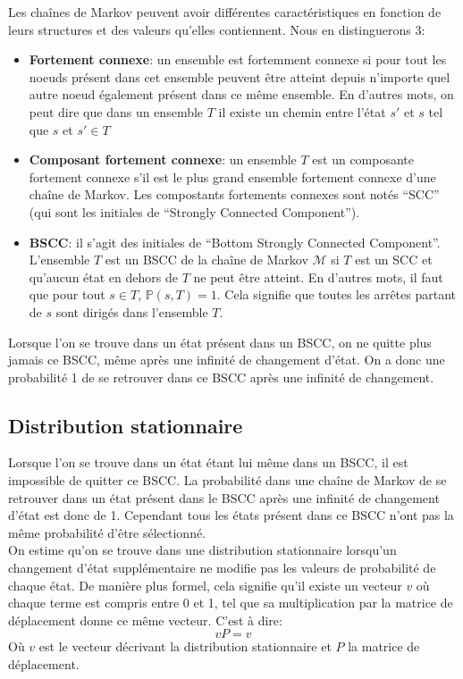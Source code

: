 \documentclass[letterpaper]{article}
\begin{document}
    Les chaînes de Markov peuvent avoir différentes caractéristiques en fonction 
    de leurs structures et des valeurs qu'elles contiennent.  
    Nous en distinguerons 3:
    \begin{itemize}
     \item \textbf{Fortement connexe}: un ensemble est fortemment connexe si pour tout
      les noeuds présent dans cet ensemble peuvent être atteint depuis n'importe quel
      autre noeud également présent dans ce même ensemble.  En d'autres mots, on peut dire 
      que dans un ensemble $T$ il existe un chemin entre l'état $s'$ et $s$ tel que 
      $s$ et $s' \in T$
     \item \textbf{Composant fortement connexe}: un ensemble $T$ est un composante fortement
      connexe s'il est le plus grand ensemble fortement connexe d'une chaîne de Markov.  
      Les compostants fortements connexes sont notés ``SCC'' (qui sont les initiales de
      ``Strongly Connected Component'').
     \item \textbf{BSCC}: il s'agit des initiales de ``Bottom Strongly Connected Component''.
      L'ensemble $T$ est un BSCC de la chaîne de Markov $\mathcal{M}$ si $T$ est un SCC et
      qu'aucun état en dehors de $T$ ne peut être atteint.  En d'autres mots, il faut que
      pour tout $s \in T$, $\mathbb{P}(s, T) = 1$.  Cela signifie que toutes les 
      arrêtes partant de $s$ sont dirigés dans l'ensemble $T$.
    \end{itemize}
    Lorsque l'on se trouve dans un état présent dans un BSCC, on ne quitte plus jamais ce
    BSCC, même après une infinité de changement d'état.  On a donc une probabilité 1 de 
    se retrouver dans ce BSCC après une infinité de changement.
  
  \subsection{Distribution stationnaire}
    Lorsque l'on se trouve dans un état étant lui même dans un BSCC, il est impossible de 
    quitter ce BSCC.  La probabilité dans une chaîne de Markov de se retrouver dans un état
    présent dans le BSCC après une infinité de changement d'état est donc de 1.  Cependant
    tous les états présent dans ce BSCC n'ont pas la même probabilité d'être sélectionné.\\
    On estime qu'on se trouve dans une distribution stationnaire lorsqu'un changement d'état
    supplémentaire ne modifie pas les valeurs de probabilité de chaque état.  De manière plus 
    formel, cela signifie qu'il existe un vecteur $v$ où chaque terme est compris entre 0 et 1,
    tel que sa multiplication par la matrice de déplacement donne ce même vecteur.  C'est à dire:
    $$v P = v$$
    Où $v$ est le vecteur décrivant la distribution stationnaire et $P$ la matrice de déplacement.
    
\end{document}
